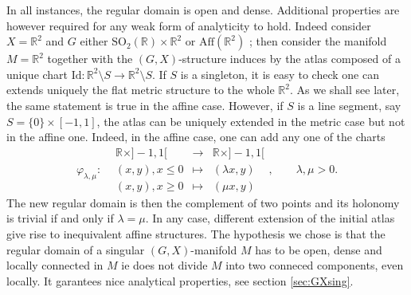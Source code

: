 \documentclass[a4paper,12pt]{article}
\def\SO{\mathrm{SO}}
\def\RR{\mathbb{R}}
\def\SO{\mathrm{SO}}
\def\RR{\mathbb R}
\newcommand{\fonctiondeux}[7]{\displaystyle#1:\begin{array}{l|rcl}
& \displaystyle #2 & \longrightarrow & \displaystyle #3 \\
	& \displaystyle #4 & \longmapsto & \displaystyle #5 \\ 
	& \displaystyle #6 & \longmapsto & \displaystyle #7\end{array}}
\begin{document}
In all instances, the regular domain is open and dense. Additional properties are however required for any weak form of analyticity to hold. Indeed consider $X=\RR^2$ and $G $ either $\SO_2(\RR)\times \RR^2$ or $\mathrm{Aff}(\RR^2)$ ; then consider the manifold $M = \RR^2$ together with the $(G,X)$-structure induces by the atlas composed of a unique chart $\mathrm{Id} : \RR^2\setminus S \rightarrow \RR^2\setminus S$.  If $S$ is a singleton, it is easy to check one can extends uniquely the flat metric structure to the whole $\RR^2$. As we shall see later, the same statement is true in the affine case.
However, if $S$ is a  line segment, say  $S=\{0\}\times [-1,1]$, the atlas can be uniquely extended in the metric case but not in the affine one. Indeed, in the affine case, one can add any one  of  the charts
$$\fonctiondeux{\varphi_{\lambda,\mu}}{\RR\times ]-1,1[}{\RR\times ]-1,1[}{(x,y),x\leq 0}{(\lambda x,y)}{(x,y),x\geq 0}{(\mu x,y)},\quad \quad \lambda,\mu>0.$$
The new regular domain is then the complement of two points and its holonomy is trivial if and only if $\lambda=\mu$. In any case, different extension of the initial atlas give rise to inequivalent affine structures.
The hypothesis we chose is that the regular domain of a singular $(G,X)$-manifold $M$ has to be open, dense and locally connected in $M$ ie does not divide $M$ into two conneced components, even locally. It garantees nice analytical properties, see section \ref{sec:GXsing}.
\end{document}
